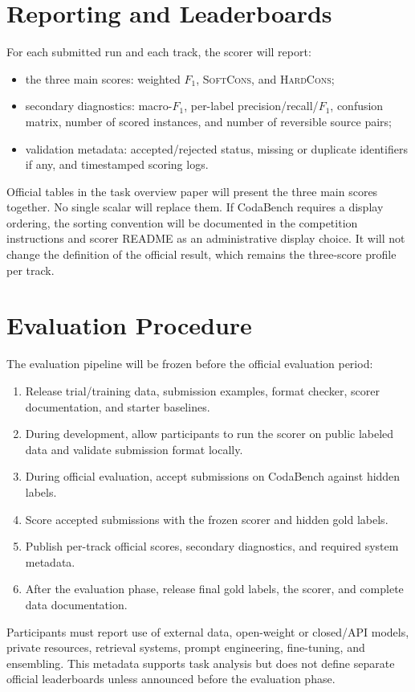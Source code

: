 \documentclass[10pt]{article}
\newcommand{\SoftCons}{\textsc{SoftCons}}
\newcommand{\HardCons}{\textsc{HardCons}}
\begin{document}
\section{Reporting and Leaderboards}

For each submitted run and each track, the scorer will report:

\begin{itemize}
\item the three main scores: weighted $F_1$, \SoftCons{}, and \HardCons{};
\item secondary diagnostics: macro-$F_1$, per-label precision/recall/$F_1$, confusion matrix, number of scored instances, and number of reversible source pairs;
\item validation metadata: accepted/rejected status, missing or duplicate identifiers if any, and timestamped scoring logs.
\end{itemize}

Official tables in the task overview paper will present the three main scores together.
No single scalar will replace them.
If CodaBench requires a display ordering, the sorting convention will be documented in the competition instructions and scorer README as an administrative display choice.
It will not change the definition of the official result, which remains the three-score profile per track.

\section{Evaluation Procedure}

The evaluation pipeline will be frozen before the official evaluation period:
\begin{enumerate}
\item Release trial/training data, submission examples, format checker, scorer documentation, and starter baselines.
\item During development, allow participants to run the scorer on public labeled data and validate submission format locally.
\item During official evaluation, accept submissions on CodaBench against hidden labels.
\item Score accepted submissions with the frozen scorer and hidden gold labels.
\item Publish per-track official scores, secondary diagnostics, and required system metadata.
\item After the evaluation phase, release final gold labels, the scorer, and complete data documentation.
\end{enumerate}

Participants must report use of external data, open-weight or closed/API models, private resources, retrieval systems, prompt engineering, fine-tuning, and ensembling.
This metadata supports task analysis but does not define separate official leaderboards unless announced before the evaluation phase.
\end{document}
